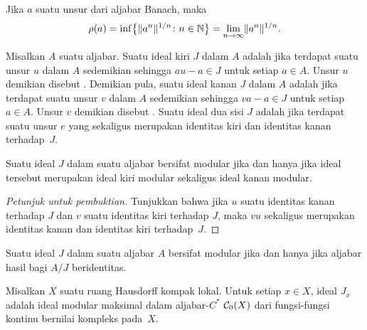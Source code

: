 \begin{thm}\label{00150018} Jika $a$ suatu unsur dari aljabar Banach,
maka
   \[ \rho(a) = \inf\bigl\{\lVert a^n\rVert^{1/n}\colon n \in \mathbb{N}\bigr\}
              = \lim_{n \rightarrow \infty} \lVert a^n\rVert^{1/n}. \]
\end{thm}

\begin{defn} Misalkan $A$ suatu aljabar. Suatu ideal kiri $J$ dalam $A$ adalah
 jika terdapat suatu unsur $u$ dalam $A$ sedemikian sehingga
$au - a \in J$ untuk setiap $a \in A$. Unsur $u$ demikian disebut
. Demikian pula, suatu ideal kanan $J$ dalam $A$ adalah
 jika terdapat suatu unsur $v$ dalam $A$ sedemikian sehingga
$va - a \in J$ untuk setiap $a \in A$. Unsur $v$ demikian disebut
. Suatu ideal dua sisi $J$ adalah
 jika terdapat suatu unsur $e$ yang sekaligus merupakan identitas kiri
dan identitas kanan terhadap~$J$.
\end{defn}

\begin{prop} Suatu ideal $J$ dalam suatu aljabar bersifat modular jika dan hanya jika ideal
tersebut merupakan ideal kiri modular sekaligus ideal kanan modular.
\end{prop}

\begin{proof}[\emph{Petunjuk untuk pembuktian}] Tunjukkan bahwa jika $u$ suatu identitas kanan
terhadap $J$ dan $v$ suatu identitas kiri terhadap $J$, maka $vu$ sekaligus merupakan
identitas kanan dan identitas kiri terhadap~$J$. \ns
\end{proof}

\begin{prop} Suatu ideal $J$ dalam suatu aljabar $A$ bersifat modular jika dan hanya jika
aljabar hasil bagi $A/J$ beridentitas.
\end{prop}

\begin{exam} Misalkan $X$ suatu ruang Hausdorff kompak lokal. Untuk setiap $x \in X$, ideal
$J_x$ adalah ideal modular maksimal dalam aljabar-$C^*$ $\mathcal{C}_0(X)$ dari fungsi-fungsi
kontinu bernilai kompleks pada~$X$.
\end{exam}

